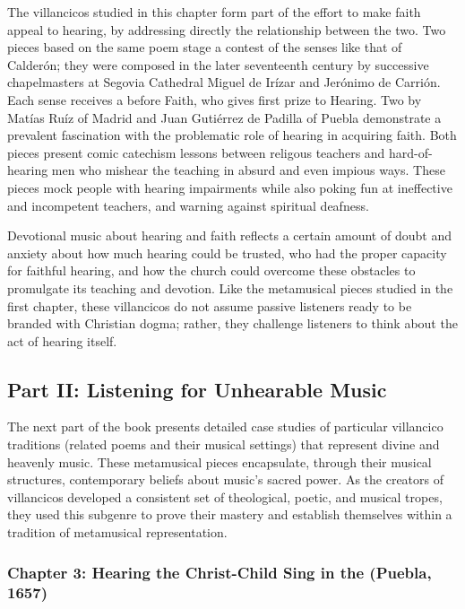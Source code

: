 \documentclass{vcbook-proposal}
\begin{document}
The villancicos studied in this chapter form part of the effort to make faith
appeal to hearing, by addressing directly the relationship between the two.
Two pieces based on the same poem stage a contest of the senses like that of
Calderón; they were composed in the later seventeenth century by successive
chapelmasters at Segovia Cathedral Miguel de Irízar and Jerónimo de Carrión.
Each sense receives a  before Faith, who gives first prize to
Hearing.
Two  by Matías Ruíz of Madrid and Juan 
Gutiérrez de Padilla of Puebla demonstrate a prevalent fascination with the 
problematic role of hearing in acquiring faith.
Both pieces present comic catechism lessons between religous teachers and 
hard-of-hearing men who mishear the teaching in absurd and even impious ways.
These pieces mock people with hearing impairments while also poking
fun at ineffective and incompetent teachers, and warning against spiritual
deafness.

Devotional music about hearing and faith reflects a certain amount of doubt and
anxiety about how much hearing could be trusted, who had the proper capacity for
faithful hearing, and how the church could overcome these obstacles to
promulgate its teaching and devotion.
Like the metamusical pieces studied in the first chapter, these villancicos do 
not assume passive listeners ready to be branded with Christian dogma; rather, 
they challenge listeners to think about the act of hearing itself.

\subsection{Part II: Listening for Unhearable Music}

The next part of the book presents detailed case studies of particular 
villancico traditions (related poems and their musical settings) that represent 
divine and heavenly music.
These metamusical pieces encapsulate, through their musical structures, 
contemporary beliefs about music's sacred power.
As the creators of villancicos developed a consistent set of theological, 
poetic, and musical tropes, they used this subgenre to prove their mastery and 
establish themselves within a tradition of metamusical representation.

\subsubsection{Chapter 3: Hearing the Christ-Child Sing in the  (Puebla, 1657)}
\end{document}
